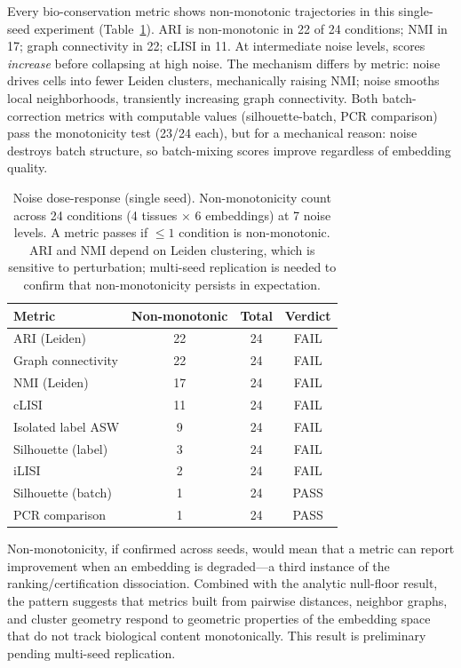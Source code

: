 \documentclass[11pt]{article}
\begin{document}
Every bio-conservation metric shows non-monotonic trajectories in this
single-seed experiment (Table~\ref{tab:noise}). ARI is non-monotonic in
22 of 24 conditions; NMI in 17; graph connectivity in 22; cLISI in 11.
At intermediate noise levels, scores \emph{increase} before collapsing
at high noise. The mechanism differs by metric: noise drives cells into
fewer Leiden clusters, mechanically raising NMI; noise smooths local
neighborhoods, transiently increasing graph connectivity. Both
batch-correction metrics with computable values (silhouette-batch, PCR
comparison) pass the monotonicity test (23/24 each), but for a
mechanical reason: noise destroys batch structure, so batch-mixing
scores improve regardless of embedding quality.

\begin{table}[t]
\centering
\caption{Noise dose-response (single seed). Non-monotonicity count
across 24 conditions (4 tissues $\times$ 6 embeddings) at 7 noise
levels. A metric passes if $\leq 1$ condition is non-monotonic. ARI
and NMI depend on Leiden clustering, which is sensitive to
perturbation; multi-seed replication is needed to confirm that
non-monotonicity persists in expectation.}
\label{tab:noise}
\small
\begin{tabular}{@{}lccc@{}}
\toprule
Metric & Non-monotonic & Total & Verdict \\
\midrule
ARI (Leiden)         & 22 & 24 & FAIL \\
Graph connectivity   & 22 & 24 & FAIL \\
NMI (Leiden)         & 17 & 24 & FAIL \\
cLISI                & 11 & 24 & FAIL \\
Isolated label ASW   &  9 & 24 & FAIL \\
Silhouette (label)   &  3 & 24 & FAIL \\
iLISI                &  2 & 24 & FAIL \\
\midrule
Silhouette (batch)   &  1 & 24 & PASS \\
PCR comparison       &  1 & 24 & PASS \\
\bottomrule
\end{tabular}
\end{table}

Non-monotonicity, if confirmed across seeds, would mean that a metric
can report improvement when an embedding is degraded---a third instance
of the ranking/certification dissociation. Combined with the analytic
null-floor result, the pattern suggests that metrics built from pairwise
distances, neighbor graphs, and cluster geometry respond to geometric
properties of the embedding space that do not track biological content
monotonically. This result is preliminary pending multi-seed
replication.
\end{document}
